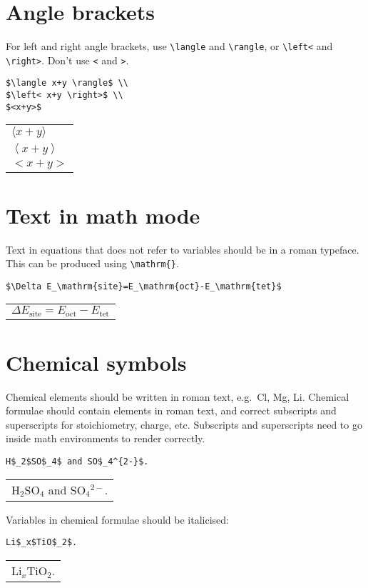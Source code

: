 \documentclass[a4paper]{tufte-handout}
\begin{document}
\section{Angle brackets} 
For left and right angle brackets, use \lstinline{\langle} and \lstinline{\rangle}, or \lstinline$\left<$ and \lstinline$\right>$. Don't use \lstinline{<} and \lstinline{>}.
\begin{lstlisting}
$\langle x+y \rangle$ \\
$\left< x+y \right>$ \\
$<x+y>$
\end{lstlisting}
\begin{tabular}{|p{10cm}}
$\langle x+y \rangle$ \\
$\left< x+y \right>$ \\
$<x+y>$
\end{tabular}

\section{Text in math mode}
Text in equations that does not refer to variables should be in a roman typeface. This can be produced using \lstinline$\mathrm{}$.
\begin{lstlisting}
$\Delta E_\mathrm{site}=E_\mathrm{oct}-E_\mathrm{tet}$
\end{lstlisting}
\begin{tabular}{|p{10cm}}
$\Delta E_\mathrm{site}=E_\mathrm{oct}-E_\mathrm{tet}$
\end{tabular}

\section{Chemical symbols}
Chemical elements should be written in roman text, e.g.\ Cl, Mg, Li.
Chemical formulae should contain elements in roman text, and correct subscripts and superscripts for stoichiometry, charge, etc. Subscripts and superscripts need to go inside math environments to render correctly.
\begin{lstlisting}
H$_2$SO$_4$ and SO$_4^{2-}$.
\end{lstlisting}
\begin{tabular}{|p{10cm}}
H$_2$SO$_4$ and SO$_4$$^{2-}$.
\end{tabular}

Variables in chemical formulae should be italicised:
\begin{lstlisting}
Li$_x$TiO$_2$.
\end{lstlisting}
\begin{tabular}{|p{10cm}}
Li$_x$TiO$_2$.
\end{tabular}
\end{document}
